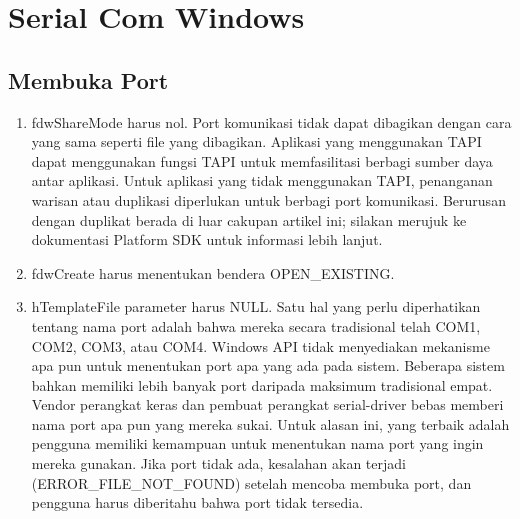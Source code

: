 \section{Serial Com Windows}
	\subsection{Membuka Port}
		\begin{enumerate} 
			Dokumentasi SDK Platform menyatakan bahwa ketika membuka port komunikasi, panggilan ke CreateFile memiliki persyaratan berikut:
				\item  fdwShareMode harus nol. Port komunikasi tidak dapat dibagikan dengan cara yang sama seperti file yang dibagikan. Aplikasi yang menggunakan TAPI dapat menggunakan fungsi TAPI untuk memfasilitasi berbagi sumber daya antar aplikasi. Untuk aplikasi yang tidak menggunakan TAPI, penanganan warisan atau duplikasi diperlukan untuk berbagi port komunikasi. Berurusan dengan duplikat berada di luar cakupan artikel ini; silakan merujuk ke dokumentasi Platform SDK untuk informasi lebih lanjut.
				\item  fdwCreate harus menentukan bendera OPEN_EXISTING.
				\item  hTemplateFile parameter harus NULL.
			Satu hal yang perlu diperhatikan tentang nama port adalah bahwa mereka secara tradisional telah COM1, COM2, COM3, atau COM4. Windows API tidak menyediakan mekanisme apa pun untuk menentukan port apa yang ada pada sistem. Beberapa sistem bahkan memiliki lebih banyak port daripada maksimum tradisional empat. Vendor perangkat keras dan pembuat perangkat serial-driver bebas memberi nama port apa pun yang mereka sukai. Untuk alasan ini, yang terbaik adalah pengguna memiliki kemampuan untuk menentukan nama port yang ingin mereka gunakan. Jika port tidak ada, kesalahan akan terjadi (ERROR_FILE_NOT_FOUND) setelah mencoba membuka port, dan pengguna harus diberitahu bahwa port tidak tersedia.
		\end{enumerate}
